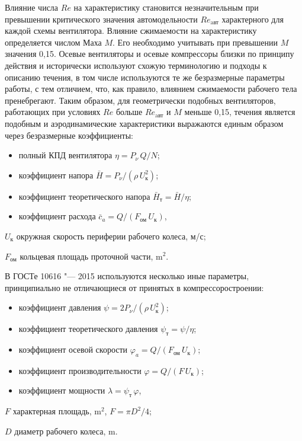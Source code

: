 Влияние числа \(Re\) на характеристику становится незначительным при превышении критического значения автомодельности \(Re_{\text{aвт}}\) характерного для каждой схемы вентилятора. Влияние сжимаемости на характеристику определяется числом Маха \(M\). Его необходимо учитывать при превышении \(M\) значения 0,15. Осевые вентиляторы и осевые компрессоры близки по принципу действия и исторически используют схожую терминологию и подходы к описанию течения, в том числе используются те же безразмерные параметры работы, с тем отличием, что, как правило, влиянием сжимаемости рабочего тела пренебрегают.
Таким образом, для геометрически подобных вентиляторов, работающих при условиях \(Re\) больше \(Re_{\text{aвт}}\) и \(M\) меньше 0,15, течения является подобным и аэродинамические характеристики выражаются единым образом через безразмерные коэффициенты:
\begin{itemize}
\item[] полный КПД вентилятора \(\eta = {P_{\nu} \, Q}/{N}\);
\item[]	коэффициент напора \(\bar{H} = P_{\nu} / (\rho \, U_\text{к}^2)\);
\item[] коэффициент теоретического напора \( \bar{H}_{\text{т}} = \bar{H} / \eta \);
\item[] коэффициент расхода \(\bar{c}_{a} = Q / (F_{\text{ом}} \, U_\text{к})\),
\end{itemize}
\begin{eqexpl}
	\item {\(U_\text{к}\)} окружная скорость периферии рабочего колеса, м/с;
	\item {\(F_{\text{ом}}\)} кольцевая площадь проточной части, \(\si{\meter}^2\).
\end{eqexpl}	

В ГОСТе 10616 "--- 2015 \cite{gost10616} используются несколько иные параметры, принципиально не отличающиеся от принятых в компрессоростроении:
\begin{itemize}
	\item[]	коэффициент давления \(\psi = 2P_{\nu} / (\rho \, U_\text{к}^2)\);
	\item[] коэффициент теоретического давления \( \psi_{\text{т}} = \psi / \eta \);
	\item[] коэффициент осевой скорости \(\varphi_{a} = Q / (F_{\text{ом}} \, U_\text{к})\);
	\item[] коэффициент производительности \(\varphi = Q / (F \, U_\text{к})\);
	\item[] коэффициент мощности \( \lambda = \psi_{\text{т}} \, \varphi \),
\end{itemize}
\begin{eqexpl}
	\item {\(F\)} характерная площадь, \(\si{\meter}^2\), \(F = \pi D^2 /4\);
	\item {\(D\)} диаметр рабочего колеса, \(\si{\meter}\).
\end{eqexpl}

